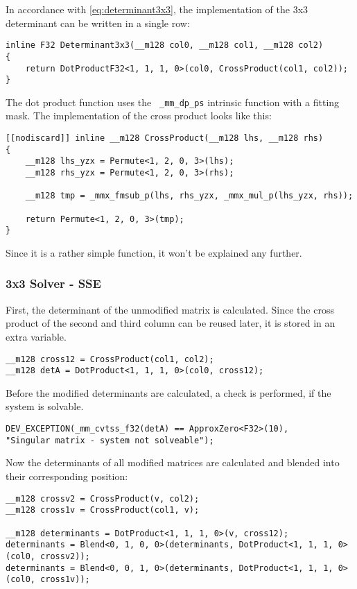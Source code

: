 \documentclass[fontsize = 10pt,DIV = 13]{scrartcl}
\begin{document}
In accordance with \cref{eq:determinant3x3}, the implementation of the 3x3 determinant can be written in a single row:

\begin{verbatim}
inline F32 Determinant3x3(__m128 col0, __m128 col1, __m128 col2)
{
    return DotProductF32<1, 1, 1, 0>(col0, CrossProduct(col1, col2));
}
\end{verbatim}

The dot product function uses the \texttt{ _mm_dp_ps} intrinsic function with a fitting mask. The implementation of the cross product looks like this:

\begin{verbatim}
[[nodiscard]] inline __m128 CrossProduct(__m128 lhs, __m128 rhs)
{
    __m128 lhs_yzx = Permute<1, 2, 0, 3>(lhs);
    __m128 rhs_yzx = Permute<1, 2, 0, 3>(rhs);

    __m128 tmp = _mmx_fmsub_p(lhs, rhs_yzx, _mmx_mul_p(lhs_yzx, rhs));

    return Permute<1, 2, 0, 3>(tmp);
}
\end{verbatim}

Since it is a rather simple function, it won't be explained any further.

\subsubsection{3x3 Solver - SSE}
\label{sec:solver3x3SSE}

First, the determinant of the unmodified matrix is calculated. Since the cross product of the second and third column can be reused later, it is stored in an extra variable.

\begin{verbatim}
__m128 cross12 = CrossProduct(col1, col2);
__m128 detA = DotProduct<1, 1, 1, 0>(col0, cross12);
\end{verbatim}

Before the modified determinants are calculated, a check is performed, if the system is solvable.

\begin{verbatim}
DEV_EXCEPTION(_mm_cvtss_f32(detA) == ApproxZero<F32>(10), 
"Singular matrix - system not solveable");
\end{verbatim}

Now the determinants of all modified matrices are calculated and blended into their corresponding position:

\begin{verbatim}
__m128 crossv2 = CrossProduct(v, col2);
__m128 cross1v = CrossProduct(col1, v);

__m128 determinants = DotProduct<1, 1, 1, 0>(v, cross12);
determinants = Blend<0, 1, 0, 0>(determinants, DotProduct<1, 1, 1, 0>(col0, crossv2));
determinants = Blend<0, 0, 1, 0>(determinants, DotProduct<1, 1, 1, 0>(col0, cross1v));
\end{verbatim}
\end{document}

